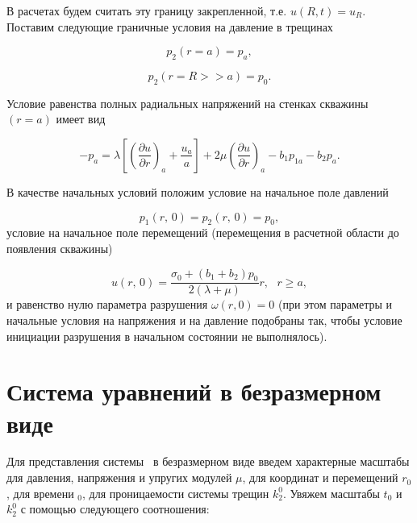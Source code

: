 В расчетах будем считать эту границу закрепленной, т.е. $u(R, t) = u_R$. Поставим следующие граничные условия на давление в трещинах

\begin{equation}
  \label{eq:p2a}
  {p_2}\left( {r = a} \right) = {p_a},
\end{equation}

\begin{equation}
  \label{eq:p2R}
  {p_2}(r = R >  > a) = {p_0}.
\end{equation}

Условие равенства полных радиальных напряжений на стенках скважины $(r = a)$ имеет вид

\begin{equation}
  \label{eq:stressa}
  - {p_a} = \lambda \left[ {{{\left( {\frac{{\partial u}}{{\partial r}}} \right)}_a} + \frac{{{u_a}}}{a}} \right] + 2\mu {\left( {\frac{{\partial u}}{{\partial r}}} \right)_a} - {b_1}{p_{1a}} - {b_2}{p_a}.
\end{equation}

В качестве начальных условий положим условие на начальное поле давлений

\begin{equation}
  \label{eq:p1p2t0}
  {p_1}\left( {r,\,0} \right) = {p_2}\left( {r,\,0} \right) = {p_0},
\end{equation}
условие на начальное поле перемещений (перемещения в расчетной области до появления скважины)

\begin{equation}
  \label{eq:ut0}
  u\left( {r,\,0} \right) = \frac{{\sigma _0^{} + ({b_1} + {b_2}){p_0}}}{{2(\lambda  + \mu )}}r,\,\,\,\,r \ge a,
\end{equation}
и равенство нулю параметра разрушения $\omega(r, 0) = 0$ (при этом параметры и начальные условия на напряжения и на давление подобраны так, чтобы условие инициации разрушения в начальном состоянии не выполнялось).

\section{Система уравнений в безразмерном виде}\label{sec:ch3/sect2}

Для представления системы~ в безразмерном виде введем характерные масштабы для давления, напряжения и упругих модулей $\mu$, для координат и перемещений $r_0$, для времени $_0$, для проницаемости системы трещин $k_2^0$. Увяжем масштабы $t_0$ и $k_2^0$ с помощью следующего соотношения:

